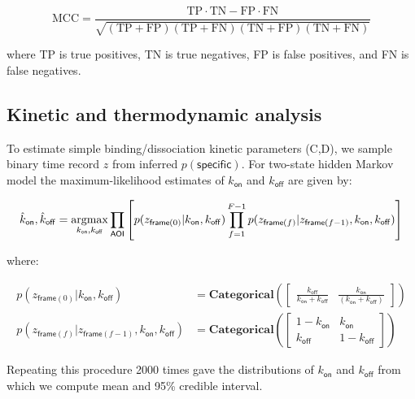 \begin{equation}
    \mathrm{MCC} =
        \dfrac{\mathrm{TP} \cdot \mathrm{TN} - \mathrm{FP} \cdot \mathrm{FN}}
        {\sqrt{(\mathrm{TP} + \mathrm{FP}) (\mathrm{TP} + \mathrm{FN}) (\mathrm{TN} + \mathrm{FP}) (\mathrm{TN} + \mathrm{FN})}}
\end{equation}

\noindent
where TP is true positives, TN is true negatives, FP is false positives, and FN is false negatives.

\subsection{Kinetic and thermodynamic analysis}

To estimate simple binding/dissociation kinetic parameters (C,D), we sample binary time record $z$ from inferred $p(\mathsf{specific})$. For two-state hidden Markov model the maximum-likelihood estimates of $k_\mathsf{on}$ and $k_\mathsf{off}$ are given by:


\begin{equation}
    \hat{k}_\mathsf{on}, \hat{k}_\mathsf{off} = \operatorname*{argmax}_{k_\mathsf{on}, k_\mathsf{off}} \prod_\mathsf{AOI} \left[ p(z_{\mathsf{frame}(0)} | k_\mathsf{on}, k_\mathsf{off}) \prod_{f=1}^{F-1} p(z_{\mathsf{frame}(f)} | z_{\mathsf{frame}(f-1)}, k_\mathsf{on}, k_\mathsf{off}) \right]
\end{equation}

where:

\begin{subequations}
\begin{align}
    p(z_{\mathsf{frame}(0)} | k_\mathsf{on}, k_\mathsf{off}) &= \mathbf{Categorical} \left( \begin{bmatrix} \frac{k_\mathsf{off}}{k_\mathsf{on} + k_\mathsf{off}} & \frac{k_\mathsf{on}}{\left( k_\mathsf{on} + k_\mathsf{off} \right)} \end{bmatrix} \right) \\
    p(z_{\mathsf{frame}(f)} | z_{\mathsf{frame}(f-1)}, k_\mathsf{on}, k_\mathsf{off}) &= \mathbf{Categorical} \left( \begin{bmatrix} 1 - k_\mathsf{on} & k_\mathsf{on} \\ k_\mathsf{off} & 1 - k_\mathsf{off} \end{bmatrix} \right)
\end{align}
\end{subequations}

Repeating this procedure 2000 times gave the distributions of $k_\mathsf{on}$ and $k_\mathsf{off}$ from which we compute mean and 95\% credible interval.

